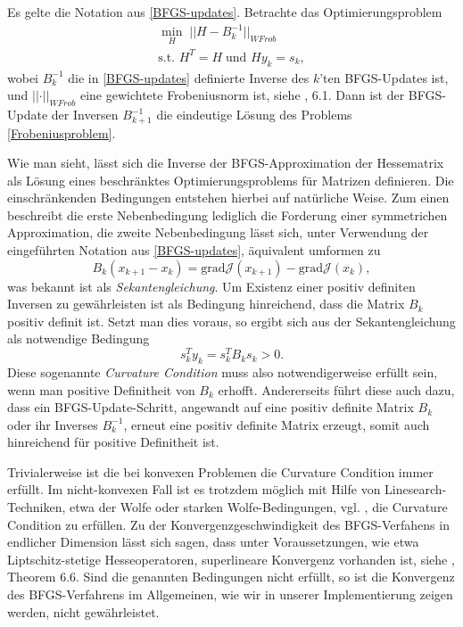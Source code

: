 \begin{theorem}
		
	Es gelte die Notation aus \ref{BFGS-updates}. Betrachte das Optimierungsproblem
	\begin{equation}\label{Frobeniusproblem}
	\begin{aligned}
		\underset{H}{\min}\; \vert\vert H - B_k^{-1} \vert\vert _{WFrob} \\
		\text{s.t. } H^T = H\; \text{und } H y_k = s_k,
	\end{aligned}
	\end{equation}
	wobei $B_k^{-1}$ die in \ref{BFGS-updates} definierte Inverse des $k$'ten BFGS-Updates ist, und \newline
$\vert\vert \cdot \vert\vert_{WFrob}$ 
eine gewichtete Frobeniusnorm ist, siehe \cite{Nocedal}, 6.1. Dann ist der BFGS-Update der Inversen $B_{k+1}^{-1}$ die eindeutige Lösung des Problems \ref{Frobeniusproblem}.
\end{theorem}
Wie man sieht, lässt sich die Inverse der BFGS-Approximation der Hessematrix als Lösung eines beschränktes Optimierungsproblems für Matrizen definieren. Die einschränkenden Bedingungen entstehen hierbei auf natürliche Weise. Zum einen beschreibt die erste Nebenbedingung lediglich die Forderung einer symmetrichen Approximation, die zweite Nebenbedingung lässt sich, unter Verwendung der eingeführten Notation aus \ref{BFGS-updates}, äquivalent umformen zu
\begin{equation}
	B_k (x_{k+1} - x_k) = \text{grad} \mathcal{J}(x_{k+1}) - \text{grad} \mathcal{J}(x_k),
\end{equation}
was bekannt ist als \textit{Sekantengleichung}. Um Existenz einer positiv definiten Inversen zu gewährleisten ist als Bedingung hinreichend, dass die Matrix $B_k$ positiv definit ist. Setzt man dies voraus, so ergibt sich aus der Sekantengleichung als notwendige Bedingung
\begin{equation}
	s_k^T y_k = s_k^T B_k s_k > 0.
\end{equation}
Diese sogenannte \textit{Curvature Condition} muss also notwendigerweise erfüllt sein, wenn man positive Definitheit von $B_k$ erhofft. Andererseits führt diese auch dazu, dass ein BFGS-Update-Schritt, angewandt auf eine positiv definite Matrix $B_k$ oder ihr Inverses $B_k^{-1}$, erneut eine positiv definite Matrix erzeugt, somit auch hinreichend für positive Definitheit ist. 

Trivialerweise ist die bei konvexen Problemen die Curvature Condition immer erfüllt. Im nicht-konvexen Fall ist es trotzdem möglich mit Hilfe von Linesearch-Techniken, etwa der Wolfe oder starken Wolfe-Bedingungen, vgl. \cite{Nocedal}, die Curvature Condition zu erfüllen. Zu der Konvergenzgeschwindigkeit des BFGS-Verfahens in endlicher Dimension lässt sich sagen, dass unter Voraussetzungen, wie etwa Liptschitz-stetige Hesseoperatoren, superlineare Konvergenz vorhanden ist, siehe \cite{Nocedal}, Theorem 6.6. Sind die genannten Bedingungen nicht erfüllt, so ist die Konvergenz des BFGS-Verfahrens im Allgemeinen, wie wir in unserer Implementierung zeigen werden, nicht gewährleistet.

